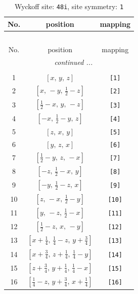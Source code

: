 \documentclass[fleqn,8pt]{jsarticle}
\begin{document}
\begin{longtable}{ccc}
\caption{Wyckoff site: {\tt 48i}, site symmetry: {\tt 1}}
 \\
 \hline \hline
No. & position & mapping \\ \hline \endfirsthead

\multicolumn{2}{l}{\tablename\ \thetable{}} \\
 \hline \hline
No. & position & mapping \\ \hline \endhead

 \hline \hline
\multicolumn{2}{r}{\footnotesize\it continued ...} \\ \endfoot

 \hline \hline
\multicolumn{2}{r}{} \\ \endlastfoot

1 & $\left[ x,\, y,\, z \right]$ & {\tt [1]} \\ \hline
2 & $\left[ x,\, - y,\, \frac{1}{2} - z \right]$ & {\tt [2]} \\ \hline
3 & $\left[ \frac{1}{2} - x,\, y,\, - z \right]$ & {\tt [3]} \\ \hline
4 & $\left[ - x,\, \frac{1}{2} - y,\, z \right]$ & {\tt [4]} \\ \hline
5 & $\left[ z,\, x,\, y \right]$ & {\tt [5]} \\ \hline
6 & $\left[ y,\, z,\, x \right]$ & {\tt [6]} \\ \hline
7 & $\left[ \frac{1}{2} - y,\, z,\, - x \right]$ & {\tt [7]} \\ \hline
8 & $\left[ - z,\, \frac{1}{2} - x,\, y \right]$ & {\tt [8]} \\ \hline
9 & $\left[ - y,\, \frac{1}{2} - z,\, x \right]$ & {\tt [9]} \\ \hline
10 & $\left[ z,\, - x,\, \frac{1}{2} - y \right]$ & {\tt [10]} \\ \hline
11 & $\left[ y,\, - z,\, \frac{1}{2} - x \right]$ & {\tt [11]} \\ \hline
12 & $\left[ \frac{1}{2} - z,\, x,\, - y \right]$ & {\tt [12]} \\ \hline
13 & $\left[ x + \frac{1}{4},\, \frac{1}{4} - z,\, y + \frac{3}{4} \right]$ & {\tt [13]} \\ \hline
14 & $\left[ x + \frac{3}{4},\, z + \frac{1}{4},\, \frac{1}{4} - y \right]$ & {\tt [14]} \\ \hline
15 & $\left[ z + \frac{3}{4},\, y + \frac{1}{4},\, \frac{1}{4} - x \right]$ & {\tt [15]} \\ \hline
16 & $\left[ \frac{1}{4} - z,\, y + \frac{3}{4},\, x + \frac{1}{4} \right]$ & {\tt [16]} \\ \hline

\end{longtable}
\end{document}
